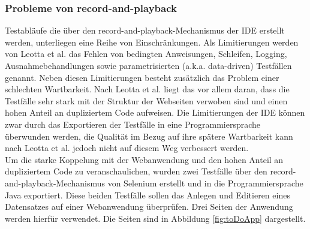 \subsubsection{Probleme von record-and-playback}
\label{sec:probleme_von_recorde_and_playback}
Testabläufe die über den \grq record-and-playback\grq -Mechanismus der IDE erstellt werden, unterliegen eine Reihe von Einschränkungen. Als Limitierungen werden von Leotta et al. \cite{leotta_repairing_2013} das Fehlen von bedingten Anweisungen, Schleifen, Logging, Ausnahmebehandlungen sowie parametrisierten (a.k.a. data-driven) Testfällen genannt.
Neben diesen Limitierungen besteht zusätzlich das Problem einer schlechten Wartbarkeit. Nach Leotta et al. \cite{leotta_repairing_2013} liegt das vor allem daran, dass die Testfälle sehr stark mit der Struktur der Webseiten verwoben sind und einen hohen Anteil an dupliziertem Code aufweisen.
Die Limitierungen der IDE können zwar durch das Exportieren der Testfälle in eine Programmiersprache überwunden werden, die Qualität im Bezug auf ihre spätere Wartbarkeit kann nach  Leotta et al. \cite{leotta_repairing_2013} jedoch nicht auf diesem Weg verbessert werden.\\
Um die starke Koppelung mit der Webanwendung und den hohen Anteil an dupliziertem Code zu veranschaulichen, wurden zwei Testfälle über den \grq record-and-playback\grq -Mechanismus von Selenium erstellt und in die Programmiersprache Java exportiert.
Diese beiden Testfälle sollen das Anlegen und Editieren eines Datensatzes auf einer Webanwendung überprüfen.
Drei Seiten der Anwendung werden hierfür verwendet. Die Seiten sind in Abbildung \ref{fig:toDoApp} dargestellt.

